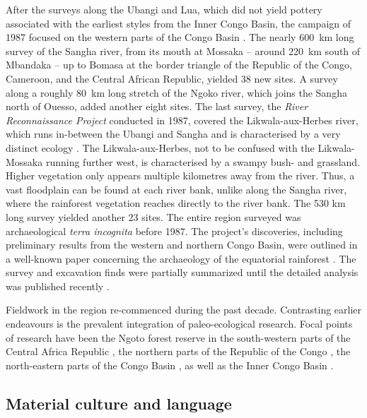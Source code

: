\documentclass[smallextended,natbib]{svjour3}       %
\begin{document}
After the surveys along the Ubangi and Lua, which did not yield pottery associated with the earliest styles from the Inner Congo Basin, the campaign of 1987 focused on the western parts of the Congo Basin \citep[Fig.~\ref{fig:map};][]{Eggert.1992}. The nearly 600~km long survey of the Sangha river, from its mouth at Mossaka – around 220~km south of Mbandaka – up to Bomasa at the border triangle of the Republic of the Congo, Cameroon, and the Central African Republic, yielded 38 new sites. A survey along a roughly 80~km long stretch of the Ngoko river, which joins the Sangha north of Ouesso, added another eight sites. The last survey, the \textit{River Reconnaissance Project} conducted in 1987, covered the Likwala-aux-Herbes river, which runs in-between the Ubangi and Sangha and is characterised by a very distinct ecology \citep{Philippon.2019}. The Likwala-aux-Herbes, not to be confused with the Likwala-Mossaka running further west, is characterised by a swampy bush- and grassland. Higher vegetation only appears multiple kilometres away from the river. Thus, a vast floodplain can be found at each river bank, unlike along the Sangha river, where the rainforest vegetation reaches directly to the river bank. The 530 km long survey yielded another 23 sites. The entire region surveyed was archaeological \textit{terra incognita} before 1987. The project’s discoveries, including preliminary results from the western and northern Congo Basin, were outlined in a well-known paper concerning the archaeology of the equatorial rainforest \citep{Eggert.1993}. The survey and excavation finds were partially summarized \citep{Seidensticker.2016b} until the detailed analysis was published recently \citep{Seidensticker.2021e}. 

Fieldwork in the region re-commenced during the past decade. Contrasting earlier endeavours is the prevalent integration of paleo-ecological research. Focal points of research have been the Ngoto forest reserve in the south-western parts of the Central Africa Republic \citep{Kiahtipes.2011,Lupo.2015,Kiahtipes.2016,Lupo.2021}, the northern parts of the Republic of the Congo \citep{Gillet.2013,MorinRivat.2014,Morin-Rivat.2017a}, the north-eastern parts of the Congo Basin \citep{Cornelissen.2013,LivingstoneSmith.2011,LivingstoneSmith.2017}, as well as the Inner Congo Basin \citep{Neumann.2022}.

\subsection*{Material culture and language}
\end{document}
